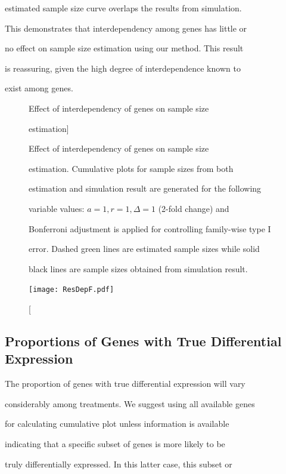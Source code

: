 \documentclass[12pt]{article}
\begin{document}
estimated sample size curve overlaps the results from simulation.

This demonstrates that interdependency among genes has little or

no effect on sample size estimation using our method. This result

is reassuring, given the high degree of interdependence known to

exist among genes.



\begin{figure}%

  \caption[Effect of interdependency of genes on sample size

    estimation] {Effect of interdependency of genes on sample size

    estimation.  Cumulative plots for sample sizes from both

    estimation and simulation result are generated for the following

    variable values: $a = 1, r = 1, \Delta = 1$ (2-fold change) and

    Bonferroni adjustment is applied for controlling family-wise type I

    error. Dashed green lines are estimated sample sizes while solid

    black lines are sample sizes obtained from simulation result.}

  \label{fig:ResDep}

  \centerline{\texttt{[image: ResDepF.pdf]}}

\end{figure}



\subsection{Proportions of Genes with True Differential Expression}



The proportion of genes with true differential expression will vary

considerably among treatments. We suggest using all available genes

for calculating cumulative plot unless information is available

indicating that a specific subset of genes is more likely to be

truly differentially expressed. In this latter case, this subset or
\end{document}
